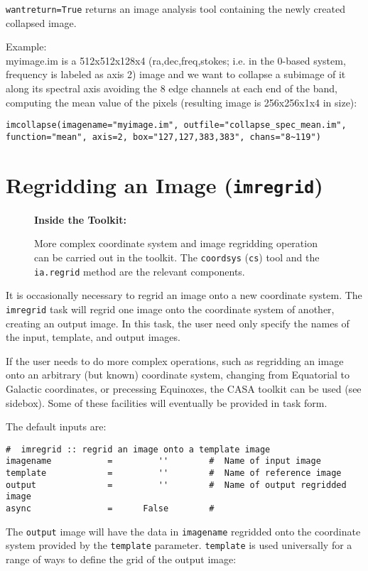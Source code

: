 {\tt wantreturn=True} returns an image analysis tool containing the
newly created collapsed image.

Example:\\

myimage.im is a 512x512x128x4 (ra,dec,freq,stokes; i.e. in the 0-based
system, frequency is labeled as axis 2) image and we want to
collapse a subimage of it along its spectral axis avoiding the 8 edge
 channels at each end of the band, computing the mean value of the
pixels (resulting image is 256x256x1x4 in size):

\small
\begin{verbatim}
imcollapse(imagename="myimage.im", outfile="collapse_spec_mean.im", function="mean", axis=2, box="127,127,383,383", chans="8~119")
\end{verbatim}
\normalsize


\section{Regridding an Image ({\tt imregrid})}
\label{section:analysis.regrid}

\begin{wrapfigure}{r}{2.5in}
  \begin{boxedminipage}{2.5in}
     \centerline{\bf Inside the Toolkit:}
     More complex coordinate system and image regridding 
     operation can be carried out in the toolkit.  The 
     {\tt coordsys} ({\tt cs}) tool and the {\tt ia.regrid}
     method are the relevant components.
  \end{boxedminipage}
\end{wrapfigure}

It is occasionally necessary to regrid an image onto a new coordinate
system.  The {\tt imregrid} task will regrid one image onto the
coordinate system of another, creating an output image.  In this
task, the user need only specify the names of the input, template, and
output images.  

If the user needs to do more complex operations, such as regridding an
image onto an arbitrary (but known) coordinate system, changing from
Equatorial to Galactic coordinates, or precessing Equinoxes, the CASA
toolkit can be used (see sidebox).  Some of these facilities will
eventually be provided in task form.

The default inputs are:
\small
\begin{verbatim}
#  imregrid :: regrid an image onto a template image
imagename           =         ''        #  Name of input image
template            =         ''        #  Name of reference image
output              =         ''        #  Name of output regridded image
async               =      False        #  
\end{verbatim}
\normalsize
The {\tt output} image will have the data in {\tt imagename} regridded
onto the coordinate system provided by the {\tt template} parameter.
{\tt template} is used universally for a range of ways to define the
grid of the output image:

